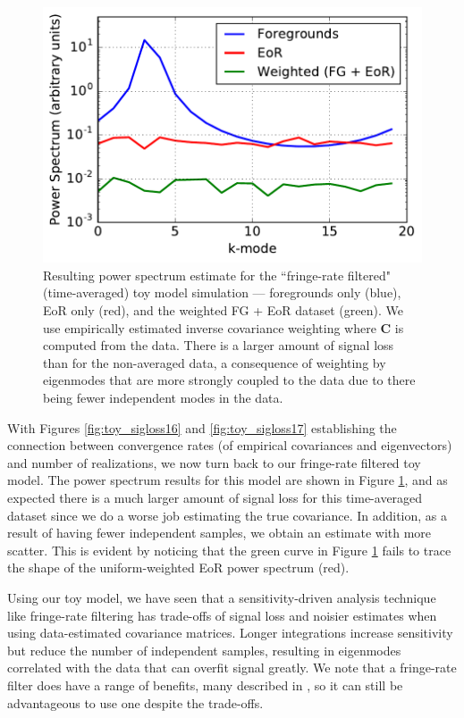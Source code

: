 \documentclass[preprint2,numberedappendix,tighten]{aastex6}  %
\begin{document}
\begin{figure}
	\centering
	\includegraphics[trim={0cm 0cm 0cm 0cm},clip,width=\columnwidth]{plots/toy_sigloss7.pdf}
	\caption{Resulting power spectrum estimate for the ``fringe-rate filtered" (time-averaged) toy model simulation --- foregrounds only (blue), 
EoR only (red), and the weighted FG + EoR dataset (green). We use empirically estimated inverse covariance weighting where $\textbf{C}$ is 
computed from the data. There is a larger amount of signal loss than for the non-averaged data, a consequence of weighting by eigenmodes that are more strongly coupled to the data due to there being fewer independent modes in the data.}
	\label{fig:toy_sigloss7}
\end{figure}


With Figures \ref{fig:toy_sigloss16} and \ref{fig:toy_sigloss17} establishing the connection between convergence rates (of empirical covariances and eigenvectors) and number of realizations, we now turn back to our fringe-rate filtered toy model. The power spectrum results for this model are shown in Figure \ref{fig:toy_sigloss7}, and as 
expected there is a much larger amount of signal loss for this time-averaged dataset since we do a worse job estimating the true covariance. In addition, as a result of having fewer independent samples, we obtain an estimate with more scatter. This is evident by noticing that the 
green curve in Figure \ref{fig:toy_sigloss7} fails to trace the shape of the uniform-weighted EoR power spectrum (red).

Using our toy model, we have seen that a sensitivity-driven analysis technique like fringe-rate filtering has trade-offs of signal 
loss and noisier estimates when using data-estimated covariance matrices. Longer integrations increase sensitivity but reduce 
the number of independent samples, resulting in 
eigenmodes correlated with the data
that can overfit signal greatly. We 
note that a fringe-rate filter does have a range of benefits, many described in \citet{parsons_et_al2016}, so it can still be 
advantageous to use one despite the trade-offs.
\end{document}
